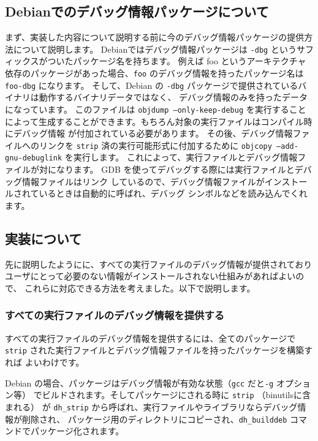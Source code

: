 \documentclass[mingoth,a4paper]{jsarticle}
\begin{document}
\subsection{Debianでのデバッグ情報パッケージについて}
まず、実装した内容について説明する前に今のデバッグ情報パッケージの提供方法について説明します。
Debianではデバッグ情報パッケージは \texttt{-dbg} というサフィックスがついたパッケージ名を持ちます。
例えば foo というアーキテクチャ依存のパッケージがあった場合、\texttt{foo} のデバッグ情報を持ったパッケージ名は
\texttt{foo-dbg} になります。
そして、Debian の \texttt{-dbg} パッケージで提供されているバイナリは動作するバイナリデータではなく、
デバッグ情報のみを持ったデータになっています。 このファイルは \texttt{objdump --only-keep-debug}
を実行することによって生成することができます。もちろん対象の実行ファイルはコンパイル時にデバッグ情報
が付加されている必要があります。
その後、デバッグ情報ファイルへのリンクを \texttt{strip} 済の実行可能形式に付加するために
\texttt{objcopy --add-gnu-debuglink} を実行します。
これによって、実行ファイルとデバッグ情報ファイルが対になります。
GDB を使ってデバッグする際には実行ファイルとデバッグ情報ファイルはリンク
しているので、デバッグ情報ファイルがインストールされているときは自動的に呼ばれ、デバッグ
シンボルなどを読み込んでくれます。

\subsection{実装について}

先に説明したようにに、すべての実行ファイルのデバッグ情報が提供されており
ユーザにとって必要のない情報がインストールされない仕組みがあればよいので、
これらに対応できる方法を考えました。以下で説明します。

\subsubsection{すべての実行ファイルのデバッグ情報を提供する}
すべての実行ファイルのデバッグ情報を提供するには、全てのパッケージで
\texttt{strip} された実行ファイルとデバッグ情報ファイルを持ったパッケージを構築すれば
よいわけです。


Debian の場合、パッケージはデバッグ情報が有効な状態（\texttt{gcc} だと\texttt{-g} オプション等）
でビルドされます。そしてパッケージにされる時に \texttt{strip} （binutilsに含まれる）
が \texttt{dh\_strip} から呼ばれ、実行ファイルやライブラリならデバッグ情報が削除され、
パッケージ用のディレクトリにコピーされ、\texttt{dh\_builddeb} コマンドでパッケージ化されます。
\end{document}
